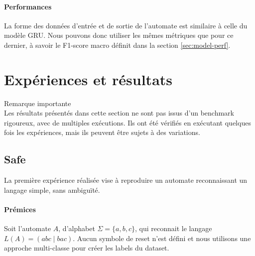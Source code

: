 \documentclass{article}
\begin{document}
\paragraph{Performances}
La forme des données d'entrée et de sortie de l'automate est similaire à celle du modèle GRU. Nous pouvons donc utiliser les 
mêmes métriques que pour ce dernier, à savoir le F1-score macro définit dans la section \ref{sec:model-perf}.

\newpage
\section{Expériences et résultats}

\begin{alert}{Remarque importante}
\\ Les résultats présentés dans cette section ne sont pas issus d'un benchmark rigoureux, avec de multiples exécutions.
Ils ont été vérifiés en exécutant quelques fois les expériences, mais ils peuvent être sujets à des variations.
\end{alert}

\subsection{Safe} 
    La première expérience réalisée vise à reproduire un automate reconnaissant un langage simple, sans ambiguïté.
\paragraph{Prémices} Soit l'automate $A$, d'alphabet $\Sigma = \{a,b,c\}$, qui reconnait le langage 
$L(A) = (abc \mid bac)$. Aucun symbole de reset n'est défini et nous utilisons une approche
multi-classe pour créer les labels du dataset.
\end{document}

